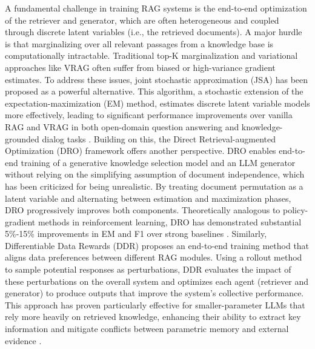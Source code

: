 \documentclass[11pt]{article}
\begin{document}
A fundamental challenge in training RAG systems is the end-to-end optimization of the retriever and generator, which are often heterogeneous and coupled through discrete latent variables (i.e., the retrieved documents). A major hurdle is that marginalizing over all relevant passages from a knowledge base is computationally intractable. Traditional top-K marginalization and variational approaches like VRAG often suffer from biased or high-variance gradient estimates. To address these issues, joint stochastic approximation (JSA) has been proposed as a powerful alternative. This algorithm, a stochastic extension of the expectation-maximization (EM) method, estimates discrete latent variable models more effectively, leading to significant performance improvements over vanilla RAG and VRAG in both open-domain question answering and knowledge-grounded dialog tasks \cite{ref220}. Building on this, the Direct Retrieval-augmented Optimization (DRO) framework offers another perspective. DRO enables end-to-end training of a generative knowledge selection model and an LLM generator without relying on the simplifying assumption of document independence, which has been criticized for being unrealistic. By treating document permutation as a latent variable and alternating between estimation and maximization phases, DRO progressively improves both components. Theoretically analogous to policy-gradient methods in reinforcement learning, DRO has demonstrated substantial 5\%-15\% improvements in EM and F1 over strong baselines \cite{ref221}. Similarly, Differentiable Data Rewards (DDR) proposes an end-to-end training method that aligns data preferences between different RAG modules. Using a rollout method to sample potential responses as perturbations, DDR evaluates the impact of these perturbations on the overall system and optimizes each agent (retriever and generator) to produce outputs that improve the system's collective performance. This approach has proven particularly effective for smaller-parameter LLMs that rely more heavily on retrieved knowledge, enhancing their ability to extract key information and mitigate conflicts between parametric memory and external evidence \cite{ref20}.
\end{document}
